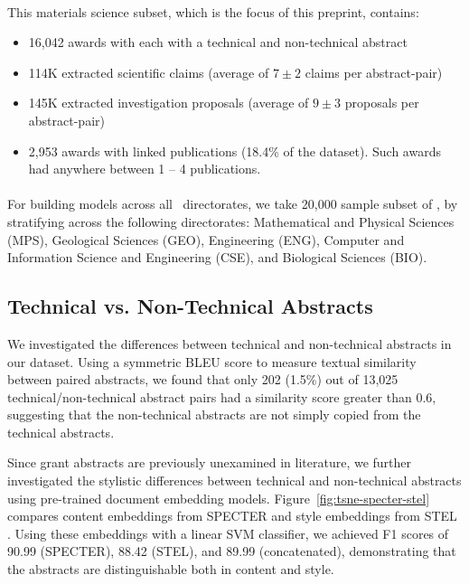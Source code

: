 \documentclass[11pt]{article}
\begin{document}
\paragraph{\DatasetNameMatSci} This materials science subset, which is the focus of this preprint, contains:
\begin{itemize}[noitemsep,topsep=0pt]
\item 16,042 awards with each with a technical and non-technical abstract
\item 114K extracted scientific claims (average of $7\pm2$ claims per abstract-pair)
\item 145K extracted investigation proposals (average of $9\pm3$ proposals per abstract-pair)
\item 2,953 awards with linked publications (18.4\% of the dataset). Such awards had anywhere between 1 -- 4 publications.
\end{itemize}

\paragraph{\DatasetNameTwentyK} For building models across all \NSF~directorates, we take 20,000 sample subset of \DatasetName, by stratifying across the following directorates: Mathematical and Physical Sciences (MPS), Geological Sciences (GEO), Engineering (ENG), Computer and Information Science and Engineering (CSE), and Biological Sciences (BIO).



\subsection{Technical vs. Non-Technical Abstracts}
We investigated the differences between technical and non-technical abstracts in our dataset. Using a symmetric BLEU score to measure textual similarity between paired abstracts, we found that only 202 (1.5\%) out of 13,025 technical/non-technical abstract pairs had a similarity score greater than 0.6, suggesting that the non-technical abstracts are not simply copied from the technical abstracts.

Since grant abstracts are previously unexamined in literature, we further investigated the stylistic differences between technical and non-technical abstracts using pre-trained document embedding models. Figure~\ref{fig:tsne-specter-stel} compares content embeddings from SPECTER \cite{cohan-etal-2020-specter} and style embeddings from STEL \cite{patel2025}. Using these embeddings with a linear SVM classifier, we achieved F1 scores of 90.99 (SPECTER), 88.42 (STEL), and 89.99 (concatenated), demonstrating that the abstracts are distinguishable both in content and style.
\end{document}
